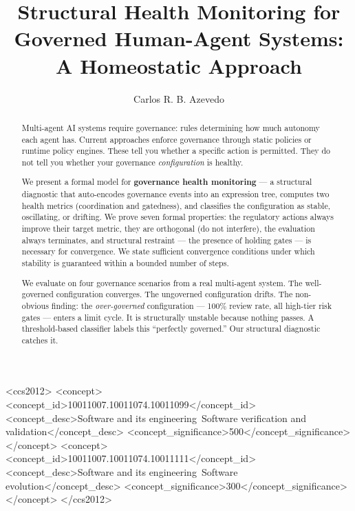 \documentclass[sigconf,nonacm]{acmart}
\begin{document}
\title{Structural Health Monitoring for Governed Human-Agent Systems:\\
A Homeostatic Approach}

\author{Carlos R. B. Azevedo}

\begin{abstract}
Multi-agent AI systems require governance: rules determining how much
autonomy each agent has. Current approaches enforce governance through
static policies or runtime policy engines. These tell you whether a
specific action is permitted. They do not tell you whether your governance
\emph{configuration} is healthy.

We present a formal model for \textbf{governance health monitoring} ---
a structural diagnostic that auto-encodes governance events into an
expression tree, computes two health metrics (coordination and
gatedness), and classifies the configuration as stable, oscillating, or
drifting. We prove seven formal properties: the regulatory actions always
improve their target metric, they are orthogonal (do not interfere),
the evaluation always terminates, and structural restraint --- the
presence of holding gates --- is necessary for convergence. We state
sufficient convergence conditions under which stability is guaranteed
within a bounded number of steps.

We evaluate on four governance scenarios from a real multi-agent system.
The well-governed configuration converges. The ungoverned configuration
drifts. The non-obvious finding: the \emph{over-governed}
configuration --- 100\% review rate, all high-tier risk gates --- enters
a limit cycle. It is structurally unstable because nothing passes. A
threshold-based classifier labels this ``perfectly governed.'' Our
structural diagnostic catches it.
\end{abstract}

\begin{CCSXML}
<ccs2012>
<concept>
<concept_id>10011007.10011074.10011099</concept_id>
<concept_desc>Software and its engineering~Software verification and validation</concept_desc>
<concept_significance>500</concept_significance>
</concept>
<concept>
<concept_id>10011007.10011074.10011111</concept_id>
<concept_desc>Software and its engineering~Software evolution</concept_desc>
<concept_significance>300</concept_significance>
</concept>
</ccs2012>
\end{CCSXML}
\end{document}
